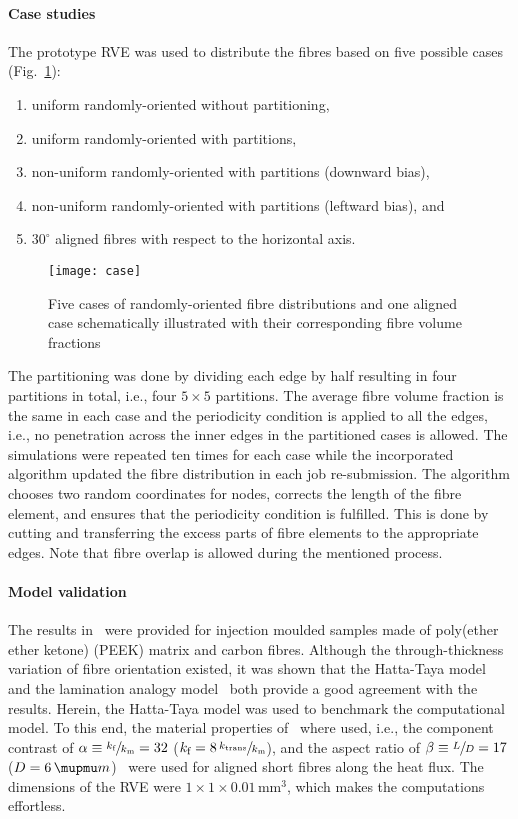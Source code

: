 \paragraph{Case studies} The prototype RVE was used to distribute the fibres based on five possible cases (Fig.~\ref{fig:case}):
\begin{enumerate}[itemsep=0cm]
\item uniform randomly-oriented without partitioning,
\item uniform randomly-oriented with partitions,
\item non-uniform randomly-oriented with partitions (downward bias), 
\item non-uniform randomly-oriented with partitions (leftward bias), and
\item  $30^\circ$ aligned fibres with respect to the horizontal axis.
\end{enumerate}
\begin{figure}[!h]
\centering
\texttt{[image: case]}
\caption{Five cases of randomly-oriented fibre distributions and one aligned case schematically illustrated with their corresponding fibre volume fractions}\label{fig:case}
\end{figure}%
The partitioning was done by dividing each edge by half resulting in four partitions in total, i.e., four $5\times5$ partitions. The average fibre volume fraction is the same in each case and the periodicity condition is applied to all the edges, i.e., no penetration across the inner edges in the partitioned cases is allowed. The simulations were repeated ten times for each case while the incorporated algorithm updated the fibre distribution in each job re-submission. The algorithm chooses two random coordinates for nodes, corrects the length of the fibre element, and ensures that the periodicity condition is fulfilled. This is done by cutting and transferring the excess parts of fibre elements to the appropriate edges. Note that fibre overlap is allowed during the mentioned process.




\red 
	\paragraph{Model validation} The results in~\autocite{Fu.2003,Choy.1994} were provided for injection moulded samples made of poly(ether ether ketone) (PEEK) matrix and carbon fibres. Although the through-thickness variation of fibre orientation existed, it was shown that the Hatta-Taya model~\autocite{Hatta.1986,Taya.1989} and the lamination analogy model~\autocite{Clyne.2019} both provide a good agreement with the results. Herein, the Hatta-Taya model was used to benchmark the computational model. To this end, the material properties of~\autocite{Fu.2003,Choy.1994} where used, i.e., the component contrast of $\alpha\equiv\sfrac{k_\text{f}}{k_\text{m}}=32$ ($k_\text{f}=8\,\sfrac{k_\text{trans}}{k_\text{m}}$), and the aspect ratio of $\beta\equiv\sfrac{L}{D}=17$ ($D=6\,\mupmu m$)~\autocite{Choy.1992} were used for aligned short fibres along the heat flux. The dimensions of the RVE were $1\times 1\times0.01\,\text{mm}^3$, which makes the computations effortless.
	
